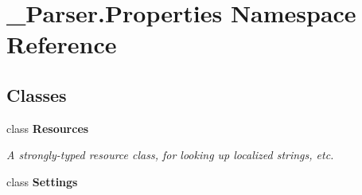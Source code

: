 \hypertarget{namespace__1920_parser_1_1_properties}{}\section{\+\_\+Parser.\+Properties Namespace Reference}
\label{namespace__1920_parser_1_1_properties}
\subsection*{Classes}
\begin{DoxyCompactItemize}
\item 
class {\bfseries Resources}
\begin{DoxyCompactList}\small\item\em A strongly-\/typed resource class, for looking up localized strings, etc. \end{DoxyCompactList}\item 
class {\bfseries Settings}
\end{DoxyCompactItemize}
